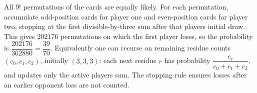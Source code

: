All $9!$ permutations of the cards are equally likely. For each permutation, accumulate odd-position cards for player one and even-position cards for player two, stopping at the first divisible-by-three sum after that player\textquotesingle s initial draw. This gives $202176$ permutations on which the first player loses, so the probability is $\dfrac{202176}{362880}=\boxed{\dfrac{39}{70}}$. Equivalently one can recurse on remaining residue counts $(c_0,c_1,c_2)$, initially $(3,3,3)$: each next residue $r$ has probability $\dfrac{c_r}{c_0+c_1+c_2}$, and updates only the active player\textquotesingle s sum. The stopping rule ensures losses after an earlier opponent loss are not counted.

